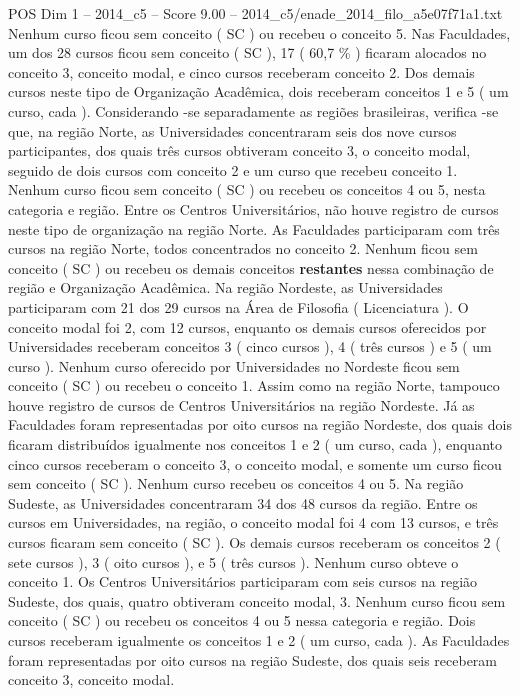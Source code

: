 \begin{textsample}{POS Dim 1 – 2014\_c5 – Score 9.00 – 2014\_c5/enade\_2014\_filo\_a5e07f71a1.txt}
Nenhum curso ficou sem conceito ( SC ) ou recebeu o conceito 5.
Nas Faculdades, um dos 28 cursos ficou sem conceito ( SC ), 17 ( 60,7 \% ) ficaram alocados no conceito 3, conceito modal, e cinco cursos receberam conceito 2.
Dos demais cursos neste tipo de Organização Acadêmica, dois receberam conceitos 1 e 5 ( um curso, cada ).
Considerando -se separadamente as regiões brasileiras, verifica -se que, na região Norte, as Universidades concentraram seis dos nove cursos participantes, dos quais três cursos obtiveram conceito 3, o conceito modal, seguido de dois cursos com conceito 2 e um curso que recebeu conceito 1.
Nenhum curso ficou sem conceito ( SC ) ou recebeu os conceitos 4 ou 5, nesta categoria e região.
Entre os Centros Universitários, não houve registro de cursos neste tipo de organização na região Norte.
As Faculdades participaram com três cursos na região Norte, todos concentrados no conceito 2.
Nenhum ficou sem conceito ( SC ) ou recebeu os demais conceitos \textbf{restantes} nessa combinação de região e Organização Acadêmica.
Na região Nordeste, as Universidades participaram com 21 dos 29 cursos na Área de Filosofia ( Licenciatura ).
O conceito modal foi 2, com 12 cursos, enquanto os demais cursos oferecidos por Universidades receberam conceitos 3 ( cinco cursos ), 4 ( três cursos ) e 5 ( um curso ).
Nenhum curso oferecido por Universidades no Nordeste ficou sem conceito ( SC ) ou recebeu o conceito 1.
Assim como na região Norte, tampouco houve registro de cursos de Centros Universitários na região Nordeste.
Já as Faculdades foram representadas por oito cursos na região Nordeste, dos quais dois ficaram distribuídos igualmente nos conceitos 1 e 2 ( um curso, cada ), enquanto cinco cursos receberam o conceito 3, o conceito modal, e somente um curso ficou sem conceito ( SC ).
Nenhum curso recebeu os conceitos 4 ou 5.
Na região Sudeste, as Universidades concentraram 34 dos 48 cursos da região.
Entre os cursos em Universidades, na região, o conceito modal foi 4 com 13 cursos, e três cursos ficaram sem conceito ( SC ).
Os demais cursos receberam os conceitos 2 ( sete cursos ), 3 ( oito cursos ), e 5 ( três cursos ).
Nenhum curso obteve o conceito 1.
Os Centros Universitários participaram com seis cursos na região Sudeste, dos quais, quatro obtiveram conceito modal, 3.
Nenhum curso ficou sem conceito ( SC ) ou recebeu os conceitos 4 ou 5 nessa categoria e região.
Dois cursos receberam igualmente os conceitos 1 e 2 ( um curso, cada ).
As Faculdades foram representadas por oito cursos na região Sudeste, dos quais seis receberam conceito 3, conceito modal.

\end{textsample}

